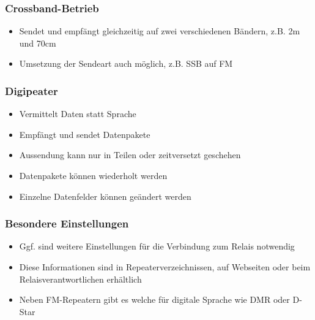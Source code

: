 \begin{frame}
\end{frame}

\begin{frame}
\frametitle{Crossband-Betrieb}
\begin{itemize}
  \item Sendet und empfängt gleichzeitig auf zwei verschiedenen Bändern, z.B. 2m und 70cm
  \item Umsetzung der Sendeart auch möglich, z.B. SSB auf FM
  \end{itemize}
\end{frame}

\begin{frame}
\frametitle{Digipeater}
\begin{itemize}
  \item Vermittelt Daten statt Sprache
  \item Empfängt und sendet Datenpakete
  \item Aussendung kann nur in Teilen oder zeitversetzt geschehen
  \item Datenpakete können wiederholt werden
  \item Einzelne Datenfelder können geändert werden
  \end{itemize}

\end{frame}

\begin{frame}
\frametitle{Besondere Einstellungen}
\begin{itemize}
  \item Ggf. sind weitere Einstellungen für die Verbindung zum Relais notwendig
  \item Diese Informationen sind in Repeaterverzeichnissen, auf Webseiten oder beim Relaisverantwortlichen erhältlich
  \item Neben FM-Repeatern gibt es welche für digitale Sprache wie DMR oder D-Star
  \end{itemize}

\end{frame}

